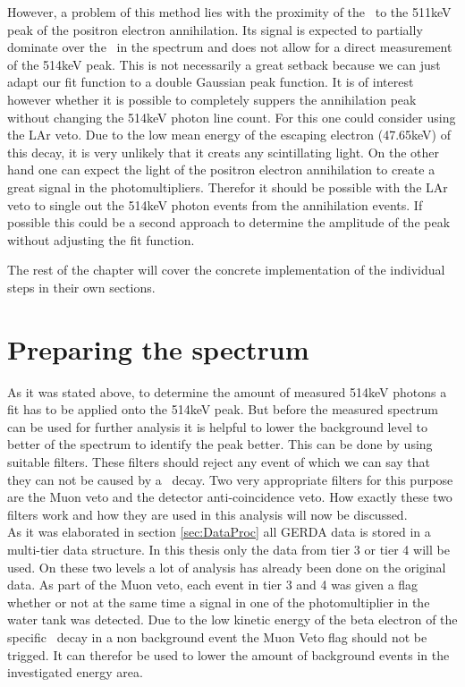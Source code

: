 \documentclass[encoding=utf8,british]{tumphthesis}
\begin{document}
However, a problem of this method lies with the proximity of the \Kr\ to the 511keV peak of the positron electron annihilation. 
Its signal is expected to partially dominate over the \Kr\ in the spectrum and does not allow for a direct measurement of the 514keV peak. 
This is not necessarily a great setback because we can just adapt our fit function to a double Gaussian peak function.
It is of interest however whether it is possible to completely suppers the annihilation peak without changing the 514keV photon line count.
For this one could consider using the LAr veto.
Due to the low mean energy of the escaping electron (47.65keV) of this decay, it is very unlikely that it creats any scintillating light. 
On the other hand one can expect the light of the positron electron annihilation to create a great signal in the photomultipliers.
Therefor it should be possible with the LAr veto to single out the 514keV photon events from the annihilation events.
If possible this could be a second approach to determine the amplitude of the peak without adjusting the fit function.

The rest of the chapter will cover the concrete implementation of the individual steps in their own sections.
\\
\section{Preparing the spectrum}

As it was stated above, to determine the amount of measured 514keV photons a fit has to be applied onto the 514keV peak. 
But before the measured spectrum can be used for further analysis it is helpful to lower the background level to better of the spectrum to identify the peak better.
This can be done by using suitable filters.
These filters should reject any event of which we can say that they can not be caused by a \Kr\ decay.
Two very appropriate filters for this purpose are the Muon veto and the detector anti-coincidence veto.
How exactly these two filters work and how they are used in this analysis will now be discussed.
\\

As it was elaborated in section \ref{sec:DataProc} all GERDA data is stored in a multi-tier data structure. 
In this thesis only the data from tier 3 or tier 4 will be used.
On these two levels a lot of analysis has already been done on the original data. 
As part of the Muon veto, each event in tier 3 and 4 was given a flag whether or not at the same time a signal in one of the photomultiplier in the water tank was detected. 
Due to the low kinetic energy of the beta electron of the specific \Kr\ decay in a non background event the Muon Veto flag should not be trigged.
It can therefor be used to lower the amount of background events in the investigated energy area.
\\
\end{document}
